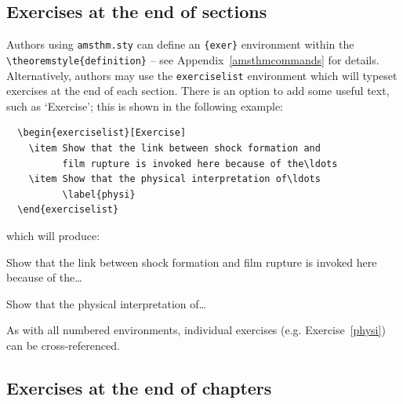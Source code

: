 \subsection{Exercises at the end of sections}
\label{exendofsections}

Authors using \verb"amsthm.sty" can define an \verb"{exer}" environment within the \verb"\theoremstyle{definition}" -- see Appendix~\ref{amsthmcommands} for details. Alternatively, authors may use the \verb"exerciselist" environment which will typeset exercises at the end of each section. There is an option to add some useful text, such as `Exercise'; this is shown in the following example:
\begin{verbatim}
  \begin{exerciselist}[Exercise]
    \item Show that the link between shock formation and
          film rupture is invoked here because of the\ldots
    \item Show that the physical interpretation of\ldots
          \label{physi}
  \end{exerciselist}
\end{verbatim}
which will produce:
  \begin{exerciselist}[Exercise]
    \item Show that the link between shock formation and
          film rupture is invoked here because of the\ldots
    \item Show that the physical interpretation of\ldots
          \label{physi}
  \end{exerciselist}
As with all numbered environments, individual exercises (e.g. Exercise~\ref{physi}) can be cross-referenced.


\subsection{Exercises at the end of chapters}

